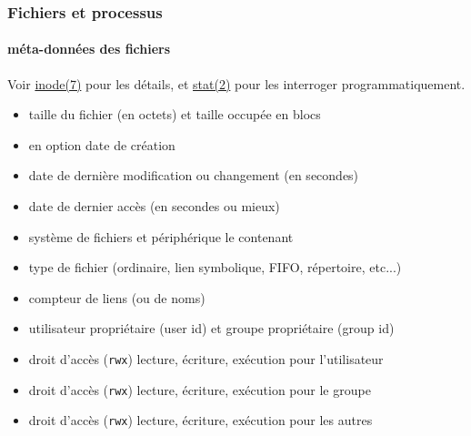 \documentclass[xcolor=svgnames,final,smaller,a4]{beamer}
\begin{document}
\begin{frame}
  \frametitle{Fichiers et processus}
  \framesubtitle{méta-données des fichiers}

  Voir \href{https://man7.org/linux/man-pages/man7/inode.7.html}{inode(7)} pour les détails, et \href{https://man7.org/linux/man-pages/man2/stat.2.html}{stat(2)} pour les interroger programmatiquement.

  \begin{relsize}{-0.5}
  \begin{itemize}
  \item taille du fichier (en octets) et taille occupée en blocs
    \item en option date de création {}
    \item date de dernière modification ou changement (en secondes)
    \item date de dernier accès (en secondes ou mieux)
    \item système de fichiers et périphérique le contenant
    \item type de fichier (ordinaire, lien symbolique, FIFO, répertoire, etc...)
    \item compteur de liens (ou de noms)
    \item utilisateur propriétaire (user id) et groupe propriétaire (group id)
    \item droit d'accès (\texttt{rwx}) lecture, écriture, exécution pour l'utilisateur
    \item droit d'accès (\texttt{rwx}) lecture, écriture, exécution pour le groupe
    \item droit d'accès (\texttt{rwx}) lecture, écriture, exécution pour les autres
  \end{itemize}
  \end{relsize}
\end{frame}
\end{document}
